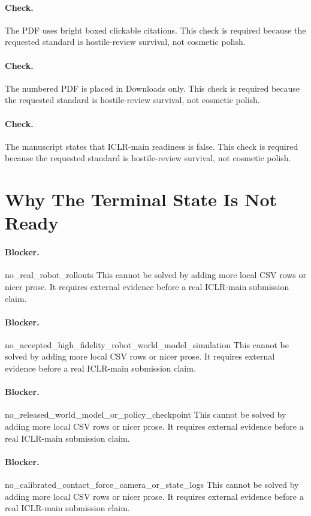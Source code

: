 \documentclass{article}
\begin{document}
\paragraph{Check.} The PDF uses bright boxed clickable citations. This check is required because the requested standard is hostile-review survival, not cosmetic polish.
\paragraph{Check.} The numbered PDF is placed in Downloads only. This check is required because the requested standard is hostile-review survival, not cosmetic polish.
\paragraph{Check.} The manuscript states that ICLR-main readiness is false. This check is required because the requested standard is hostile-review survival, not cosmetic polish.
\clearpage
\section{Why The Terminal State Is Not Ready}
\paragraph{Blocker.} no\_real\_robot\_rollouts This cannot be solved by adding more local CSV rows or nicer prose. It requires external evidence before a real ICLR-main submission claim.
\paragraph{Blocker.} no\_accepted\_high\_fidelity\_robot\_world\_model\_simulation This cannot be solved by adding more local CSV rows or nicer prose. It requires external evidence before a real ICLR-main submission claim.
\paragraph{Blocker.} no\_released\_world\_model\_or\_policy\_checkpoint This cannot be solved by adding more local CSV rows or nicer prose. It requires external evidence before a real ICLR-main submission claim.
\paragraph{Blocker.} no\_calibrated\_contact\_force\_camera\_or\_state\_logs This cannot be solved by adding more local CSV rows or nicer prose. It requires external evidence before a real ICLR-main submission claim.
\end{document}
